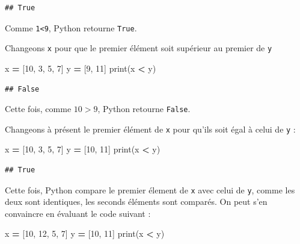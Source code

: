 \documentclass[12pt,]{book}
\newenvironment{Shaded}{\begin{snugshade}}{\end{snugshade}}
\newcommand{\DecValTok}[1]{\textcolor[rgb]{0.00,0.00,0.81}{#1}}
\newcommand{\OperatorTok}[1]{\textcolor[rgb]{0.81,0.36,0.00}{\textbf{#1}}}
\newcommand{\BuiltInTok}[1]{#1}
\newcommand{\NormalTok}[1]{#1}
\numberwithin{equation}{section}
\numberwithin{countremarque}{section}
\begin{document}
\begin{lstlisting}
## True
\end{lstlisting}

Comme \texttt{1\textless{}9}, Python retourne \texttt{True}.

Changeons \texttt{x} pour que le premier élément soit supérieur au
premier de \texttt{y}

\begin{Shaded}
\begin{Highlighting}[]
\NormalTok{x }\OperatorTok{=}\NormalTok{ [}\DecValTok{10}\NormalTok{, }\DecValTok{3}\NormalTok{, }\DecValTok{5}\NormalTok{, }\DecValTok{7}\NormalTok{]}
\NormalTok{y }\OperatorTok{=}\NormalTok{ [}\DecValTok{9}\NormalTok{, }\DecValTok{11}\NormalTok{]}
\BuiltInTok{print}\NormalTok{(x }\OperatorTok{<}\NormalTok{ y)}
\end{Highlighting}
\end{Shaded}

\begin{lstlisting}
## False
\end{lstlisting}

Cette fois, comme \(10>9\), Python retourne \texttt{False}.

Changeons à présent le premier élément de \texttt{x} pour qu'ils soit
égal à celui de \texttt{y} :

\begin{Shaded}
\begin{Highlighting}[]
\NormalTok{x }\OperatorTok{=}\NormalTok{ [}\DecValTok{10}\NormalTok{, }\DecValTok{3}\NormalTok{, }\DecValTok{5}\NormalTok{, }\DecValTok{7}\NormalTok{]}
\NormalTok{y }\OperatorTok{=}\NormalTok{ [}\DecValTok{10}\NormalTok{, }\DecValTok{11}\NormalTok{]}
\BuiltInTok{print}\NormalTok{(x }\OperatorTok{<}\NormalTok{ y)}
\end{Highlighting}
\end{Shaded}

\begin{lstlisting}
## True
\end{lstlisting}

Cette fois, Python compare le premier élement de \texttt{x} avec celui
de \texttt{y}, comme les deux sont identiques, les seconds éléments sont
comparés. On peut s'en convaincre en évaluant le code suivant :

\begin{Shaded}
\begin{Highlighting}[]
\NormalTok{x }\OperatorTok{=}\NormalTok{ [}\DecValTok{10}\NormalTok{, }\DecValTok{12}\NormalTok{, }\DecValTok{5}\NormalTok{, }\DecValTok{7}\NormalTok{]}
\NormalTok{y }\OperatorTok{=}\NormalTok{ [}\DecValTok{10}\NormalTok{, }\DecValTok{11}\NormalTok{]}
\BuiltInTok{print}\NormalTok{(x }\OperatorTok{<}\NormalTok{ y)}
\end{Highlighting}
\end{Shaded}
\end{document}
